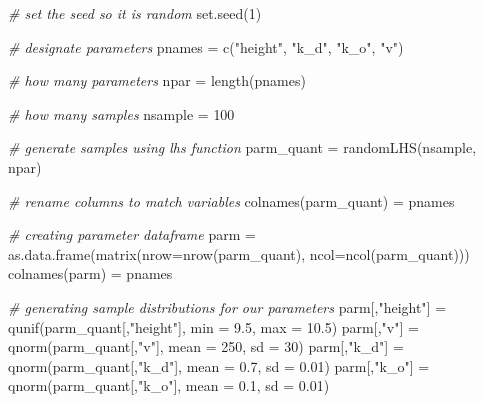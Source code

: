 \documentclass[
]{article}
\newenvironment{Shaded}{\begin{snugshade}}{\end{snugshade}}
\newcommand{\AttributeTok}[1]{\textcolor[rgb]{0.77,0.63,0.00}{#1}}
\newcommand{\CommentTok}[1]{\textcolor[rgb]{0.56,0.35,0.01}{\textit{#1}}}
\newcommand{\DecValTok}[1]{\textcolor[rgb]{0.00,0.00,0.81}{#1}}
\newcommand{\FloatTok}[1]{\textcolor[rgb]{0.00,0.00,0.81}{#1}}
\newcommand{\FunctionTok}[1]{\textcolor[rgb]{0.00,0.00,0.00}{#1}}
\newcommand{\NormalTok}[1]{#1}
\newcommand{\OtherTok}[1]{\textcolor[rgb]{0.56,0.35,0.01}{#1}}
\newcommand{\StringTok}[1]{\textcolor[rgb]{0.31,0.60,0.02}{#1}}
\begin{document}
\begin{Shaded}
\begin{Highlighting}[]
\CommentTok{\# set the seed so it is random}
\FunctionTok{set.seed}\NormalTok{(}\DecValTok{1}\NormalTok{)}

\CommentTok{\# designate parameters}
\NormalTok{pnames }\OtherTok{=} \FunctionTok{c}\NormalTok{(}\StringTok{"height"}\NormalTok{, }\StringTok{"k\_d"}\NormalTok{, }\StringTok{"k\_o"}\NormalTok{, }\StringTok{"v"}\NormalTok{)}

\CommentTok{\# how many parameters}
\NormalTok{npar }\OtherTok{=}  \FunctionTok{length}\NormalTok{(pnames)}

\CommentTok{\# how many samples}
\NormalTok{nsample }\OtherTok{=} \DecValTok{100}

\CommentTok{\# generate samples using lhs function}
\NormalTok{parm\_quant }\OtherTok{=} \FunctionTok{randomLHS}\NormalTok{(nsample, npar)}

\CommentTok{\# rename columns to match variables}
\FunctionTok{colnames}\NormalTok{(parm\_quant) }\OtherTok{=}\NormalTok{ pnames }

\CommentTok{\# creating parameter dataframe}
\NormalTok{parm }\OtherTok{=} \FunctionTok{as.data.frame}\NormalTok{(}\FunctionTok{matrix}\NormalTok{(}\AttributeTok{nrow=}\FunctionTok{nrow}\NormalTok{(parm\_quant), }\AttributeTok{ncol=}\FunctionTok{ncol}\NormalTok{(parm\_quant)))}
\FunctionTok{colnames}\NormalTok{(parm) }\OtherTok{=}\NormalTok{ pnames}

\CommentTok{\# generating sample distributions for our parameters}
\NormalTok{parm[,}\StringTok{"height"}\NormalTok{] }\OtherTok{=} \FunctionTok{qunif}\NormalTok{(parm\_quant[,}\StringTok{"height"}\NormalTok{], }\AttributeTok{min =} \FloatTok{9.5}\NormalTok{, }\AttributeTok{max =} \FloatTok{10.5}\NormalTok{)}
\NormalTok{parm[,}\StringTok{"v"}\NormalTok{] }\OtherTok{=} \FunctionTok{qnorm}\NormalTok{(parm\_quant[,}\StringTok{"v"}\NormalTok{], }\AttributeTok{mean =} \DecValTok{250}\NormalTok{, }\AttributeTok{sd =} \DecValTok{30}\NormalTok{)}
\NormalTok{parm[,}\StringTok{"k\_d"}\NormalTok{] }\OtherTok{=} \FunctionTok{qnorm}\NormalTok{(parm\_quant[,}\StringTok{"k\_d"}\NormalTok{], }\AttributeTok{mean =} \FloatTok{0.7}\NormalTok{, }\AttributeTok{sd =} \FloatTok{0.01}\NormalTok{)}
\NormalTok{parm[,}\StringTok{"k\_o"}\NormalTok{] }\OtherTok{=} \FunctionTok{qnorm}\NormalTok{(parm\_quant[,}\StringTok{"k\_o"}\NormalTok{], }\AttributeTok{mean =} \FloatTok{0.1}\NormalTok{, }\AttributeTok{sd =} \FloatTok{0.01}\NormalTok{)}
\end{Highlighting}
\end{Shaded}
\end{document}
